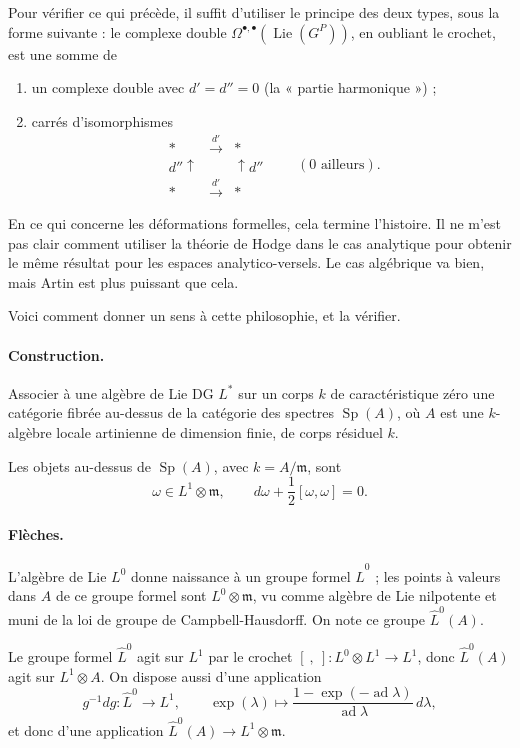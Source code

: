 \documentclass[11pt]{article}
\newcommand{\Lie}{\operatorname{Lie}}
\newcommand{\Sp}{\operatorname{Sp}}
\newcommand{\ad}{\operatorname{ad}}
\newcommand{\expop}{\operatorname{exp}}
\begin{document}
Pour vérifier ce qui précède, il suffit d'utiliser le principe des deux types, sous la forme suivante : le complexe double $\Omega^{\bullet,\bullet}(\Lie(G^P))$, en oubliant le crochet, est une somme de
\begin{enumerate}[label=\alph*)]
\item un complexe double avec $d'=d''=0$ (la « partie harmonique ») ;
\item carrés d'isomorphismes
\[
\begin{array}{ccc}
 * & \xrightarrow{\ d'\ } & * \\
 {\scriptstyle d''}\uparrow && \uparrow{\scriptstyle d''} \\
 * & \xrightarrow{\ d'\ } & *
\end{array}
\qquad (0\text{ ailleurs}).
\]
\end{enumerate}

En ce qui concerne les déformations formelles, cela termine l'histoire. Il ne m'est pas clair comment utiliser la théorie de Hodge dans le cas analytique pour obtenir le même résultat pour les espaces analytico-versels. Le cas algébrique va bien, mais Artin est plus puissant que cela.

Voici comment donner un sens à cette philosophie, et la vérifier.

\paragraph{Construction.}
Associer à une algèbre de Lie DG $L^*$ sur un corps $k$ de caractéristique zéro une catégorie fibrée au-dessus de la catégorie des spectres $\Sp(A)$, où $A$ est une $k$-algèbre locale artinienne de dimension finie, de corps résiduel $k$.

Les objets au-dessus de $\Sp(A)$, avec $k=A/\mathfrak m$, sont
\[
  \omega\in L^1\otimes\mathfrak m,
  \qquad
  d\omega+\frac12[\omega,\omega]=0.
\]

\paragraph{Flèches.}
L'algèbre de Lie $L^0$ donne naissance à un groupe formel $\widehat L^0$ ; les points à valeurs dans $A$ de ce groupe formel sont $L^0\otimes\mathfrak m$, vu comme algèbre de Lie nilpotente et muni de la loi de groupe de Campbell-Hausdorff. On note ce groupe $\widehat L^0(A)$.

Le groupe formel $\widehat L^0$ agit sur $L^1$ par le crochet $[\ ,\ ]:L^0\otimes L^1\to L^1$, donc $\widehat L^0(A)$ agit sur $L^1\otimes A$. On dispose aussi d'une application
\[
  g^{-1}dg:\widehat L^0\longrightarrow L^1,
  \qquad
  \expop(\lambda)\longmapsto
  \frac{1-\expop(-\ad\lambda)}{\ad\lambda}\,d\lambda,
\]
et donc d'une application $\widehat L^0(A)\to L^1\otimes\mathfrak m$.
\end{document}
